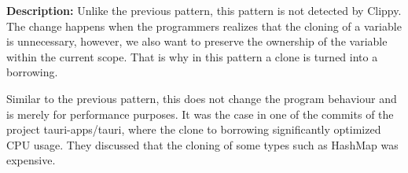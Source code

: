 \noindent \textbf{Description:} Unlike the previous pattern, this pattern is not detected by Clippy. The change happens when the programmers realizes that the cloning of a variable is unnecessary, however, we also want to preserve the ownership of the variable within the current scope. That is why in this pattern a clone is turned into a borrowing. 

Similar to the previous pattern, this does not change the program behaviour and is merely for performance purposes. It was the case in one of the commits of the project tauri-apps/tauri, where the clone to borrowing significantly optimized CPU usage. They discussed that the cloning of some types such as HashMap was expensive.



\begin{table}[]

\hskip-2.5cm\begin{tabular}{|l|l|l|l|}
\hline


\end{tabular}
\end{table}
